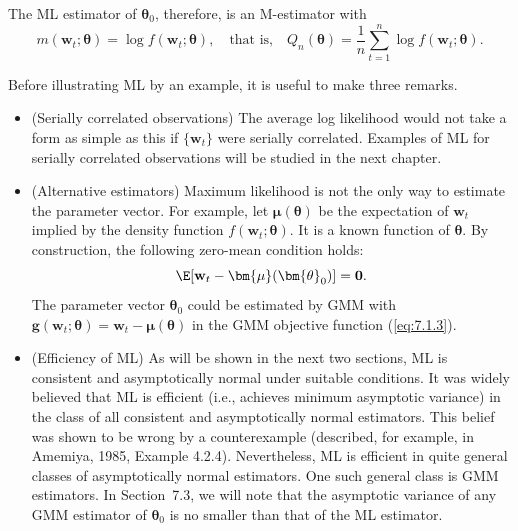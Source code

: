 The ML estimator of $\bm{\theta}_0$, therefore, is an M-estimator with
\begin{equation}
\label{eq:7.1.6}
m(\mathbf{w}_t; \bm{\theta}) = \log f(\mathbf{w}_t; \bm{\theta}), \quad \text{that is,} \quad Q_n(\bm{\theta}) = \frac{1}{n} \sum_{t=1}^{n} \log f(\mathbf{w}_t; \bm{\theta}).
\end{equation}

Before illustrating ML by an example, it is useful to make three remarks.

\begin{itemize}
\item (Serially correlated observations) \enspace The average log likelihood would not take a form as simple as this if $\{\mathbf{w}_t\}$ were serially correlated. Examples of ML for serially correlated observations will be studied in the next chapter.

\item (Alternative estimators) \enspace Maximum likelihood is not the only way to estimate the parameter vector. For example, let $\bm{\mu}(\bm{\theta})$ be the expectation of $\mathbf{w}_t$ implied by the density function $f(\mathbf{w}_t; \bm{\theta})$. It is a known function of $\bm{\theta}$. By construction, the following zero-mean condition holds:
\begin{equation}
\label{eq:7.1.7}
\E[\mathbf{w}_t - \bm{\mu}(\bm{\theta}_0)] = \mathbf{0}.
\end{equation}
The parameter vector $\bm{\theta}_0$ could be estimated by GMM with $\mathbf{g}(\mathbf{w}_t; \bm{\theta}) = \mathbf{w}_t - \bm{\mu}(\bm{\theta})$ in the GMM objective function (\ref{eq:7.1.3}).

\item (Efficiency of ML) \enspace As will be shown in the next two sections, ML is consistent and asymptotically normal under suitable conditions. It was widely believed that ML is efficient (i.e., achieves minimum asymptotic variance) in the class of all consistent and asymptotically normal estimators. This belief was shown to be wrong by a counterexample (described, for example, in Amemiya, 1985, Example 4.2.4). Nevertheless, ML is efficient in quite general classes of asymptotically normal estimators. One such general class is GMM estimators. In Section~7.3, we will note that the asymptotic variance of any GMM estimator of $\bm{\theta}_0$ is no smaller than that of the ML estimator.
\end{itemize}


